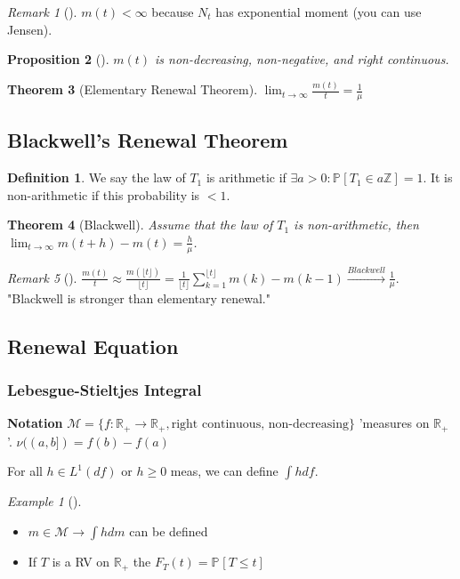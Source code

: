 \documentclass[12pt]{book}
\newtheorem{theorem}{Theorem}[section]
\newtheorem{prop}[theorem]{Proposition}
\theoremstyle{definition}
\newtheorem{defn}{Definition}[section]
\theoremstyle{remark}
\newtheorem{ex}{Example}[section]
\newtheorem{rmk}[theorem]{Remark}
\begin{document}
\begin{rmk}[]
	$m(t)<\infty$ because $N _t$ has exponential moment (you can use Jensen).
\end{rmk}

\begin{prop}[]
	$m(t)$ is non-decreasing, non-negative, and right continuous.
\end{prop}

\begin{theorem}[Elementary Renewal Theorem]
	$\lim_{t \to \infty} \frac{m(t)}{t}=\frac{1}{\mu }$
\end{theorem}

\subsection{Blackwell's Renewal Theorem}
\begin{defn}
	We say the law of $T_1$ is arithmetic if $\exists a > 0: \mathbb{P}_{} \left[ T_1 \in a \mathbb{Z} \right] =1$. It is non-arithmetic if this probability is $<1$.
\end{defn}

\begin{theorem}[Blackwell]
	Assume that the law of $T_1$ is non-arithmetic, then $\lim_{t \to \infty} m(t+h)-m(t) = \frac{h}{\mu }$.
\end{theorem}

\begin{rmk}[]
	$ \frac{m(t)}{t} \approx \frac{m(\lfloor t \rfloor)}{\lfloor t \rfloor} = \frac{1}{\lfloor t \rfloor} \sum_{k=1}^{\lfloor t \rfloor} m(k) - m(k-1) \stackrel{Blackwell}{\to} \frac{1}{\mu}$. "Blackwell is stronger than elementary renewal."
\end{rmk}

\subsection{Renewal Equation}

\subsubsection{Lebesgue-Stieltjes Integral} 
\textbf{Notation} $ \mathcal{M} = \{ f: \mathbb{R}_+ \to \mathbb{R}_+, \textrm{right continuous, non-decreasing}\}$ 'measures on $\mathbb{R}_+$ '. $\nu((a,b])=f(b)-f(a)$

For all $h \in L^1(df)$ or $h\geq 0$ meas, we can define $\int h df$.

\begin{ex}[]
\begin{itemize}
	\item $m \in \mathcal{M} \to \int h dm$ can be defined	
	\item If $T$ is a RV on $\mathbb{R}_+$ the $F_T(t) = \mathbb{P}_{} \left[ T \leq t \right] $
\end{itemize}

\end{ex}
\end{document}
